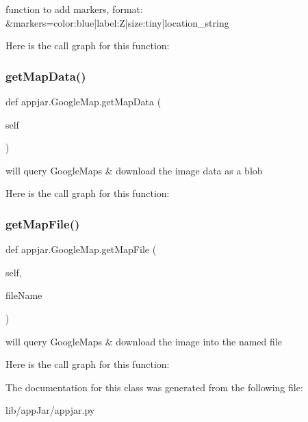 \begin{DoxyVerb}function to add markers, format:
    &markers=color:blue|label:Z|size:tiny|location_string
\end{DoxyVerb}
 Here is the call graph for this function\+:
\mbox{\label{classappjar_1_1_google_map_aea059cc2c47eb5372938612d543f01c3}} 
\subsubsection{\texorpdfstring{get\+Map\+Data()}{getMapData()}}
{\footnotesize\ttfamily def appjar.\+Google\+Map.\+get\+Map\+Data (\begin{DoxyParamCaption}\item[{}]{self }\end{DoxyParamCaption})}

\begin{DoxyVerb}will query GoogleMaps & download the image data as a blob \end{DoxyVerb}
 Here is the call graph for this function\+:
\mbox{\label{classappjar_1_1_google_map_a81ef64dac6edd30e382a7c09de5d9762}} 
\subsubsection{\texorpdfstring{get\+Map\+File()}{getMapFile()}}
{\footnotesize\ttfamily def appjar.\+Google\+Map.\+get\+Map\+File (\begin{DoxyParamCaption}\item[{}]{self,  }\item[{}]{file\+Name }\end{DoxyParamCaption})}

\begin{DoxyVerb}will query GoogleMaps & download the image into the named file \end{DoxyVerb}
 Here is the call graph for this function\+:


The documentation for this class was generated from the following file\+:\begin{DoxyCompactItemize}
\item 
lib/app\+Jar/appjar.\+py\end{DoxyCompactItemize}
